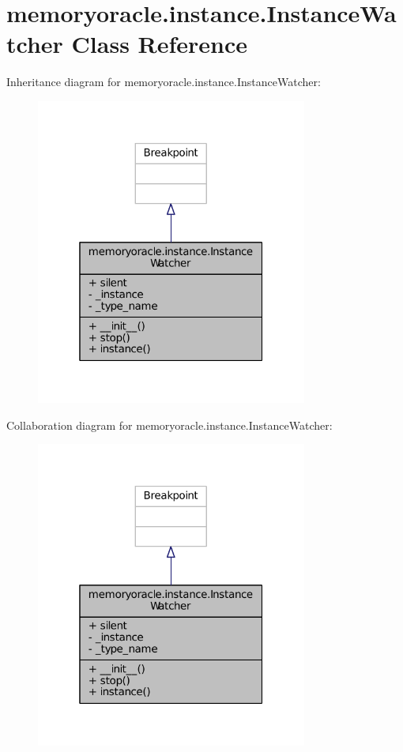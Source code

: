 \hypertarget{classmemoryoracle_1_1instance_1_1InstanceWatcher}{}\section{memoryoracle.\+instance.\+Instance\+Watcher Class Reference}
\label{classmemoryoracle_1_1instance_1_1InstanceWatcher}


Inheritance diagram for memoryoracle.\+instance.\+Instance\+Watcher\+:\nopagebreak
\begin{figure}[H]
\begin{center}
\leavevmode
\includegraphics[width=253pt]{classmemoryoracle_1_1instance_1_1InstanceWatcher__inherit__graph}
\end{center}
\end{figure}


Collaboration diagram for memoryoracle.\+instance.\+Instance\+Watcher\+:\nopagebreak
\begin{figure}[H]
\begin{center}
\leavevmode
\includegraphics[width=253pt]{classmemoryoracle_1_1instance_1_1InstanceWatcher__coll__graph}
\end{center}
\end{figure}
